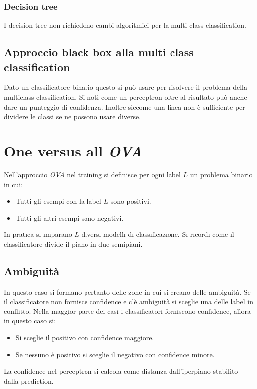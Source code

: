 		\subsubsection{Decision tree}
		I decision tree non richiedono cambi algoritmici per la multi class classification.

	\subsection{Approccio black box alla multi class classification}
	Dato un classificatore binario questo si pu\`o usare per risolvere il problema della multiclass classification.
	Si noti come un perceptron oltre al risultato pu\`o anche dare un punteggio di confidenza.
	Inoltre siccome una linea non \`e sufficiente per dividere le classi se ne possono usare diverse.

\section{One versus all \emph{OVA}}
Nell'approccio \emph{OVA} nel training si definisce per ogni label $L$ un problema binario in cui:
\begin{multicols}{2}
	\begin{itemize}
		\item Tutti gli esempi con la label $L$ sono positivi.
		\item Tutti gli altri esempi sono negativi.
	\end{itemize}
\end{multicols}
In pratica si imparano $L$ diversi modelli di classificazione.
Si ricordi come il classificatore divide il piano in due semipiani.

	\subsection{Ambiguit\`a}
	In questo caso si formano pertanto delle zone in cui si creano delle ambiguit\`a.
	Se il classificatore non fornisce confidence e c'\`e ambiguit\`a si sceglie una delle label in conflitto.
	Nella maggior parte dei casi i classificatori forniscono confidence, allora in questo caso si:
	\begin{multicols}{2}
		\begin{itemize}
			\item Si sceglie il positivo con confidence maggiore.
			\item Se nessuno \`e positivo si sceglie il negativo con confidence minore.
		\end{itemize}
	\end{multicols}
	La confidence nel perceptron si calcola come distanza dall'iperpiano stabilito dalla prediction.

